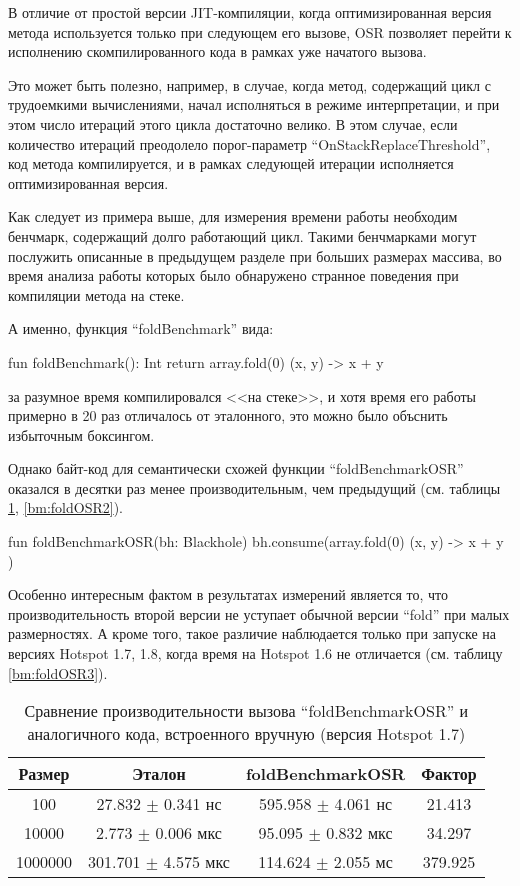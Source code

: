 В отличие от простой версии JIT-компиляции, когда оптимизированная версия метода используется
только при следующем его вызове, OSR позволяет перейти к исполнению скомпилированного кода в рамках
уже начатого вызова.

Это может быть полезно, например, в случае, когда метод, содержащий цикл с трудоемкими вычислениями,
начал исполняться в режиме интерпретации, и при этом число итераций этого цикла достаточно велико.
В этом случае, если количество итераций преодолело порог-параметр ``OnStackReplaceThreshold'',
код метода компилируется, и в рамках следующей итерации исполняется оптимизированная версия.

Как следует из примера выше, для измерения времени работы необходим бенчмарк, содержащий долго
работающий цикл.
Такими бенчмарками могут послужить описанные в предыдущем разделе при больших размерах массива,
во время анализа работы которых было обнаружено странное поведения при компиляции метода на стеке.

А именно, функция ``foldBenchmark'' вида:
\begin{pyglist}[language=kotlin]
    fun foldBenchmark(): Int {
        return array.fold(0) { (x, y) -> x + y }
    }
\end{pyglist}

за разумное время компилировался <<на стеке>>, и хотя время его работы примерно в 20 раз
отличалось от эталонного, это можно было объснить избыточным боксингом.

Однако байт-код для семантически схожей функции ``foldBenchmarkOSR'' оказался в десятки раз менее
производительным, чем предыдущий (см. таблицы \ref{bm:foldOSR}, \ref{bm:foldOSR2}).
\begin{pyglist}[language=kotlin]
    fun foldBenchmarkOSR(bh: Blackhole) {
        bh.consume(array.fold(0) { (x, y) -> x + y })
    }
\end{pyglist}

Особенно интересным фактом в результатах измерений является то, что производительность второй
версии не уступает обычной версии ``fold'' при малых размерностях.
А кроме того, такое различие наблюдается только при запуске на версиях Hotspot 1.7, 1.8, когда
время на Hotspot 1.6 не отличается (см. таблицу \ref{bm:foldOSR3}).

\begin{table}[h]
\begin{center}
\begin{tabular}{|c|c|c|c|} \hline
Размер & Эталон & foldBenchmarkOSR & Фактор \\ \hline
100 & 27.832 $\pm$ 0.341 нс & 595.958 $\pm$ 4.061 нс & 21.413\\ \hline
10000 & 2.773 $\pm$ 0.006 мкс & 95.095 $\pm$ 0.832 мкс & 34.297\\ \hline
1000000 & 301.701 $\pm$ 4.575 мкс & 114.624 $\pm$ 2.055 мс & 379.925\\ \hline
\end{tabular}
\caption{Сравнение производительности вызова ``foldBenchmarkOSR'' и аналогичного кода, встроенного вручную (версия Hotspot 1.7)}
\label{bm:foldOSR}
\end{center}
\end{table}

